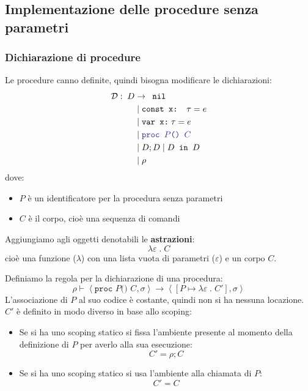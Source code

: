 \documentclass[a4paper]{article}
\begin{document}
\subsection{Implementazione delle procedure senza parametri}
\subsubsection{Dichiarazione di procedure}
Le procedure canno definite, quindi bisogna modificare le dichiarazioni:
\[
  \begin{aligned}
    \mathcal{D}: \; D & \to  \texttt{ nil}  \\
                      & \mid \texttt{const x: } \tau = e  \\
                      & \mid \texttt{var x:}\; \tau = e \\
                      & \mid \mathcolor{Blue}{\texttt{proc } P \texttt{() } C} \\
                      & \mid D; D  \mid D \texttt{ in } D \\
                      & \mid \rho
  \end{aligned}
\] 
dove:
\begin{itemize}
  \item \( P \) è un identificatore per la procedura senza parametri
  \item \( C \) è il corpo, cioè una sequenza di comandi
\end{itemize}
Aggiungiamo agli oggetti denotabili le \textbf{astrazioni}:
\[
  \lambda \varepsilon \;.\; C
\] 
cioè una funzione (\( \lambda \)) con una lista vuota di parametri (\( \varepsilon \))
e un corpo \( C \).

\vspace{1em}
\noindent
Definiamo la regola per la dichiarazione di una procedura:
\[
  \rho \vdash \left< \texttt{proc }  P \texttt{() } C , \sigma \right>
  \to \left<\left[ P \mapsto \lambda \varepsilon \;.\; C' \right], \sigma  \right>
\] 
L'associazione di \( P \) al suo codice è costante, quindi non si ha nessuna
locazione.
\( C' \) è definito in modo diverso in base allo scoping:
\begin{itemize}
  \item Se si ha uno scoping statico si fissa l'ambiente presente al momento
    della definizione di \( P \) per averlo alla sua esecuzione:
    \[
      C' = \rho ; C
    \] 

  \item Se si ha uno scoping statico si usa l'ambiente alla chiamata di \( P \):
    \[
      C' = C
    \] 
\end{itemize}
\end{document}

